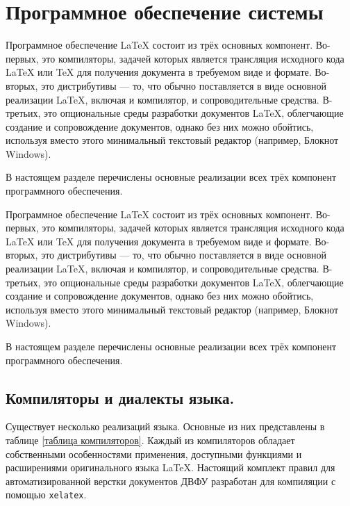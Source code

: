 \documentclass[report, draught]{fefudoc}
\begin{document}
\section{Программное обеспечение системы}
Программное обеспечение \LaTeX{} состоит из трёх основных компонент.
Во-первых, это компиляторы, задачей которых является трансляция исходного кода \LaTeX{} или \TeX{} для получения документа в требуемом виде и формате.
Во-вторых, это дистрибутивы --- то, что обычно поставляется в виде основной реализации \LaTeX{}, включая и компилятор, и сопроводительные средства.
В-третьих, это опциональные среды разработки документов \LaTeX{}, облегчающие создание и сопровождение документов, однако без них можно обойтись, используя вместо этого минимальный текстовый редактор (например, Блокнот Windows).

В настоящем разделе перечислены основные реализации всех трёх компонент программного обеспечения.

Программное обеспечение \LaTeX{} состоит из трёх основных компонент.
Во-первых, это компиляторы, задачей которых является трансляция исходного кода \LaTeX{} или \TeX{} для получения документа в требуемом виде и формате.
Во-вторых, это дистрибутивы --- то, что обычно поставляется в виде основной реализации \LaTeX{}, включая и компилятор, и сопроводительные средства.
В-третьих, это опциональные среды разработки документов \LaTeX{}, облегчающие создание и сопровождение документов, однако без них можно обойтись, используя вместо этого минимальный текстовый редактор (например, Блокнот Windows).

В настоящем разделе перечислены основные реализации всех трёх компонент программного обеспечения.

\subsection{Компиляторы и диалекты языка.}
Существует несколько реализаций языка.
Основные из них представлены в таблице \ref{таблица компиляторов}.
Каждый из компиляторов обладает собственными особенностями применения, доступными функциями и расширениями оригинального языка \LaTeX{}.
Настоящий комплект правил для автоматизированной верстки документов ДВФУ разработан для компиляции с помощью \texttt{xelatex}.
\end{document}
